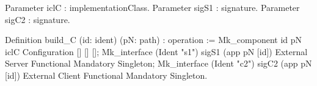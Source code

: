 Parameter iclC : implementationClass.
Parameter sigS1 : signature.
Parameter sigC2 : signature.

Definition build_C (id: ident) (pN: path) : operation := 
  Mk_component id pN iclC Configuration [] [] [];
  Mk_interface (Ident "s1") sigS1 (app pN [id]) 
               External Server Functional Mandatory Singleton;
  Mk_interface (Ident "c2") sigC2 (app pN [id]) 
               External Client Functional Mandatory Singleton.